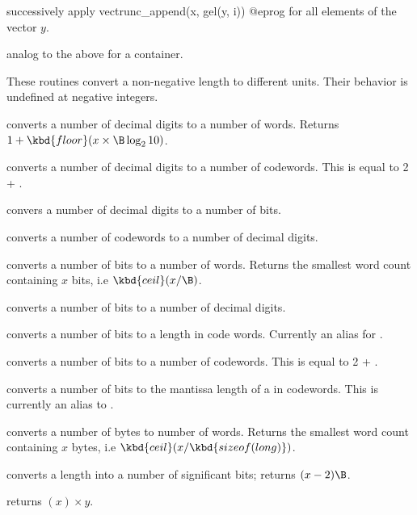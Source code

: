  successively apply
\bprog
  vectrunc_append(x, gel(y, i))
@eprog
for all elements of the vector $y$.


 analog to the above for a
 container.


These routines convert a non-negative length to different units. Their
behavior is undefined at negative integers.

 converts a number of decimal digits to a number
of words. Returns $ 1 + \kbd{floor}(x \times \B \log_2 10)$.

 converts a number of decimal digits to a number
of codewords. This is equal to 2 + .

 convers a number of decimal digits to a
number of bits.

 converts a number of codewords to a
number of decimal digits.

 converts a number of bits to a number of
words. Returns the smallest word count containing $x$ bits, i.e $
\kbd{ceil}(x / \B)$.

 converts a number of bits to a number of
decimal digits.

 converts a number of bits to a length
in code words. Currently  an alias for .

 converts a number of bits to a number of
codewords. This is equal to 2 + .

 converts a number of bits to the mantissa
length of a  in codewords. This is currently an alias to
.

 converts a number of bytes to number of
words. Returns the smallest word count containing $x$ bytes, i.e
$\kbd{ceil}(x / \kbd{sizeof(long)})$.

 converts a  length into a number
of significant bits; returns $(x - 2)\B$.

 returns
$(x)\times y$.

